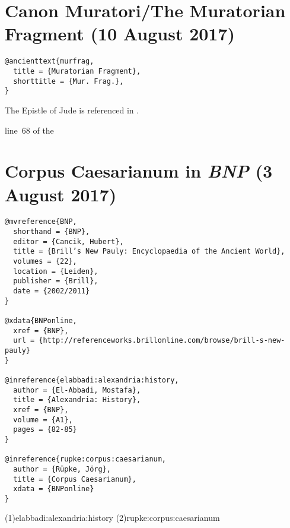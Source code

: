 \documentclass[a4paper]{article}
\begin{document}

\section{Canon Muratori/The Muratorian Fragment (10 August 2017)}

\begin{verbatim}
@ancienttext{murfrag,
  title = {Muratorian Fragment},
  shorttitle = {Mur. Frag.},
}
\end{verbatim}

\begin{verbcite}
  The Epistle of Jude is referenced in \cite[(68)]{murfrag}.
\end{verbcite}
\begin{verbcite}
  \parencite[(\lineno~68)]{murfrag}
\end{verbcite}
\begin{verbcite}
  line~68 of the 
\end{verbcite}
\exampleancientsources
{}

\section{Corpus Caesarianum in \emph{BNP} (3 August 2017)}

\begin{verbatim}
@mvreference{BNP,
  shorthand = {BNP},
  editor = {Cancik, Hubert},
  title = {Brill’s New Pauly: Encyclopaedia of the Ancient World},
  volumes = {22},
  location = {Leiden},
  publisher = {Brill},
  date = {2002/2011}
}

@xdata{BNPonline,
  xref = {BNP},
  url = {http://referenceworks.brillonline.com/browse/brill-s-new-pauly}
}

@inreference{elabbadi:alexandria:history,
  author = {El-Abbadi, Mostafa},
  title = {Alexandria: History},
  xref = {BNP},
  volume = {A1},
  pages = {82-85}
}

@inreference{rupke:corpus:caesarianum,
  author = {Rüpke, Jörg},
  title = {Corpus Caesarianum},
  xdata = {BNPonline}
}
\end{verbatim}

\examplecite(1){elabbadi:alexandria:history}
\examplecite(2){rupke:corpus:caesarianum}
\exampleabbreviations
\examplebibliography
{}
\end{document}

